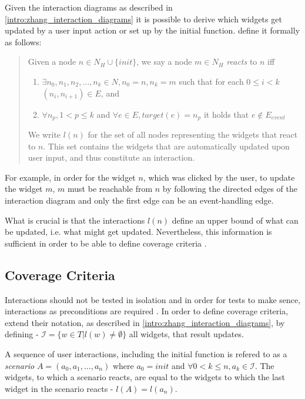 Given the interaction diagrams as described in \ref{intro:zhang_interaction_diagrams} it is possible to derive which widgets get updated by a user input action or set up by the initial function. \textcite{zhang2019scenario} define it formally as follows:
\begin{quote}
\label{quote:interactions}
Given a node $n \in N_H \cup \{init\}$, we say a node $m \in N_H$ \textit{reacts} to $n$ iff
  \begin{enumerate}
      \item $\exists n_0,n_1,n_2, \ldots,n_k \in N, n_0=n,n_k=m$ such that for each $0 \leq i < k  $ $(n_i,n_{i+1}) \in E$, and 
      \item $\forall n_p, 1 < p \leq k$ and $\forall e \in E, target(e)= n_p$ it holds that $e \notin E_{event}$  
  \end{enumerate}
  We write $l(n)$ for the set of all nodes representing the widgets that react to $n$. This set contains the widgets that are automatically updated upon user input,
  and thus constitute an interaction.
  \end{quote}

For example, in order for the widget $n$, which was clicked by the user, to update the widget $m$, $m$ must be reachable from $n$ by following the directed edges of the interaction diagram and only the first edge can be an event-handling edge.

What is crucial is that the interactions $l(n)$ define an upper bound of what can be updated, i.e. what might get updated. Nevertheless, this information is sufficient in order to be able to define coverage criteria \parencite{zhang2019scenario}.

\subsection{Coverage Criteria}
Interactions should not be tested in isolation and in order for tests to make sence, interactions as preconditions are required \parencite{zhang2019scenario}. 
In order to define coverage criteria, \textcite{zhang2019scenario} extend their notation, as described in \ref{intro:zhang_interaction_diagrams}, by defining - $\mathcal{I}  = \{w\in T | l(w) \neq \emptyset \}$ all widgets, that result updates.

A sequence of user interactions, including the initial function is refered to as a \textit{scenario} $A=(a_0,a_1,\ldots, a_n)$ where $a_0=init$ and $\forall0 < k \leq n, a_k \in \mathcal{I}$. The widgets, to which a scenario reacts, are equal to the widgets to which the last widget in the scenario reacts 
- $l(A)=l(a_n)$. 


